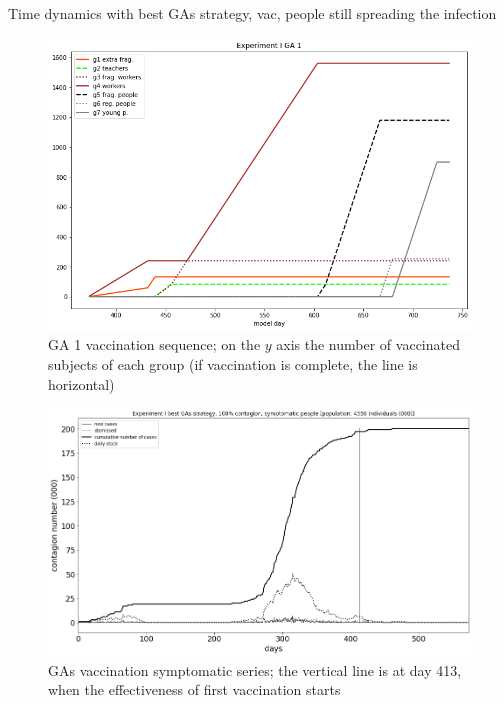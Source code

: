 \documentclass[9pt]{beamer}
\begin{document}
\begin{frame}{Time dynamics with best GAs strategy, vac, people still spreading the infection}

\begin{figure}[H]
\center
\includegraphics[scale=0.16]{Experiment_I_GA_1_VaccinationSequence.png} %

\caption{GA 1 vaccination sequence; on the $y$ axis the number of vaccinated subjects of each group (if vaccination is complete, the line is horizontal)} 
\label{Experiment_I_GA1VaccinationSequence}
\end{figure}

\begin{figure}[H]
\center
\includegraphics[scale=0.16]{Experiment_I_1_GAs_symptomatic_series.png} 

\caption{GAs vaccination symptomatic series; the vertical line is at day 413, when the effectiveness of first vaccination starts} 
\label{Experiment_I_GAs1SymptomaticSeries}
\end{figure}


\end{frame}
\end{document}
